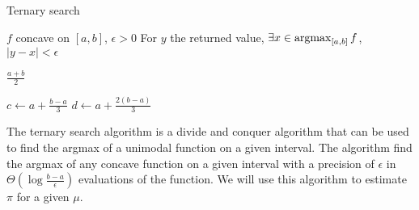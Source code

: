 \begin{algorithm}[H]
    \caption{Ternary search}
    \begin{algorithmic}[1]
    \Require $f$ concave on $[a, b]$, $\epsilon > 0$
    \Ensure For $y$ the returned value, $\exists x \in \operatorname*{argmax}_{[a, b]} f$, $|y - x| < \epsilon$
    

        \State \Return $\frac{a + b}{2}$
    \EndIf
    
    \State $c \leftarrow a + \frac{b - a}{3}$
    \State $d \leftarrow a + \frac{2(b - a)}{3}$
    
        \State \Return {}
    \Else
        \State \Return {}
    \EndIf
    \EndFunction
    
    \end{algorithmic}
    \end{algorithm}


The ternary search algorithm is a divide and conquer algorithm that can be used to find the argmax of a unimodal function on a given interval. The algorithm find the argmax of any concave function on a given interval with a precision of $\epsilon$ in $\Theta(\log \frac{b - a}{\epsilon})$ evaluations of the function. We will use this algorithm to estimate $\pi$ for a given $\mu$.

